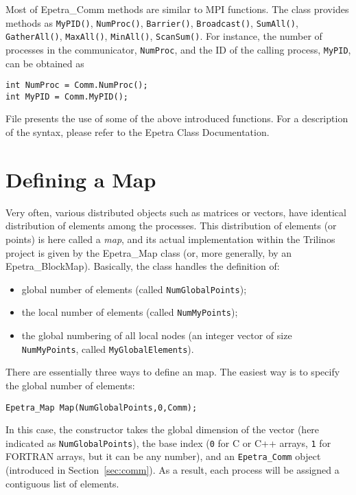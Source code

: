 Most of Epetra\_Comm methods are similar to MPI functions. The class
provides methods as \verb!MyPID()!, \verb!NumProc()!, \verb!Barrier()!,
\verb!Broadcast()!, \verb!SumAll()!, \verb!GatherAll()!,
\verb!MaxAll()!, \verb!MinAll()!, \verb!ScanSum()!.  For instance, the
number of processes in the communicator, \verb!NumProc!, and the ID of
the calling process, \verb!MyPID!, can be obtained as
\begin{verbatim}
int NumProc = Comm.NumProc();
int MyPID = Comm.MyPID();
\end{verbatim}

File  presents the use of some of the above
introduced functions.  For a description of the syntax, please refer to
the Epetra Class Documentation.


\section{Defining a Map}
\label{sec:map}

Very often, various distributed objects such as matrices or vectors,
have identical distribution of elements among the processes.  This
distribution of elements (or points) is here called a {\sl map}, and its
actual implementation within the Trilinos project is given by the
Epetra\_Map class (or, more generally, by an Epetra\_BlockMap).
Basically, the class handles the definition of:
\begin{itemize}
\item global number of elements (called \verb!NumGlobalPoints!);
\item the local number of elements (called \verb!NumMyPoints!);
\item the global numbering of all local nodes (an integer vector of size
  \verb!NumMyPoints!, called \verb!MyGlobalElements!).
\end{itemize}

There are essentially three ways to define an map. The easiest way is to
specify the global number of elements:
\begin{verbatim}
Epetra_Map Map(NumGlobalPoints,0,Comm);
\end{verbatim}
In this case, the constructor takes the global dimension of the vector
(here indicated as \verb!NumGlobalPoints!), the base index (\verb!0! for
C or C++ arrays, \verb!1! for FORTRAN arrays, but it can be any number),
and an \verb!Epetra_Comm!  object (introduced in
Section~\ref{sec:comm}). As a result, each process will be assigned a
contiguous list of elements.

